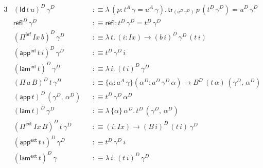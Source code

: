 \documentclass[12pt,a4paper,twoside,openany]{book}
\theoremstyle{remark}
\theoremstyle{definition}
\theoremstyle{theorem}
\newcommand{\mi}[1]{\mathit{#1}}
\newcommand{\ms}[1]{\mathsf{#1}}
\newcommand{\tr}{\ms{tr}}
\newcommand{\refl}{\mathsf{refl}}
\newcommand{\Id}{\mathsf{Id}}
\newcommand{\Pie}{\Pi^{\mathsf{ext}}}
\newcommand{\appe}{\mathsf{app^{ext}}}
\newcommand{\lame}{\mathsf{lam^{ext}}}
\newcommand{\Piinf}{\Pi^{\mathsf{inf}}}
\newcommand{\appinf}{\mathsf{app^{inf}}}
\newcommand{\laminf}{\mathsf{lam^{inf}}}
\newcommand{\app}{\ms{app}}
\newcommand{\lam}{\ms{lam}}
\newcommand{\defn}{:\equiv}
\begin{document}
\begin{alignat*}{3}
  &(\Id\,t\,u)^D\,\gamma^D &&\defn \lambda\,(p : t^A\,\gamma = u^A\,\gamma).\,\tr_{(a^D\,\gamma^D)}\,p\,(t^D\,\gamma^D) = u^D\,\gamma^D\\
  &\refl^D\,\gamma^D &&\defn \refl : t^D\,\gamma^D = t^D\,\gamma^D\\
  &(\Piinf\,\mi{Ix}\,b)^D\,\gamma^D &&\defn \lambda\,t.\,(i : \mi{Ix}) \to (b\,i)^D\,\gamma^D\,(t\,i)\\
  &(\appinf\,t\,i)^D\,\gamma^D &&\defn t^D\,\gamma^D\,i\\
  &(\laminf\,t)^D\,\gamma^D &&\defn \lambda\,i.\,(t\,i)^D\,\gamma^D\\
  &(\Pi\,a\,B)^D\,t\,\gamma^D &&\defn \{\alpha : a^A\,\gamma\}(\alpha^D : a^D\,\gamma^D\,\alpha)
    \to B^D\,(t\,\alpha)\,(\gamma^D,\,\alpha^D)\\
  &(\app\,t)^D\,(\gamma^D,\,\alpha^D) &&\defn t^D\,\gamma^D\,\alpha^D\\
  &(\lam\,t)^D\,\gamma^D &&\defn \lambda\,\{\alpha\}\,\alpha^D.\,t^D\,(\gamma^D,\,\alpha^D)\\
  &(\Pie\,\mi{Ix}\,B)^D\,t\,\gamma^D &&\defn (i : \mi{Ix}) \to (B\,i)^D\,(t\,i)\,\gamma^D\\
  &(\appe\,t\,i)^D\,\gamma^D &&\defn t^D\,\gamma^D\,i\\
  &(\lame\,t)^D\,\gamma &&\defn \lambda\,i.\,(t\,i)^D\,\gamma^D
\end{alignat*}
\end{document}

